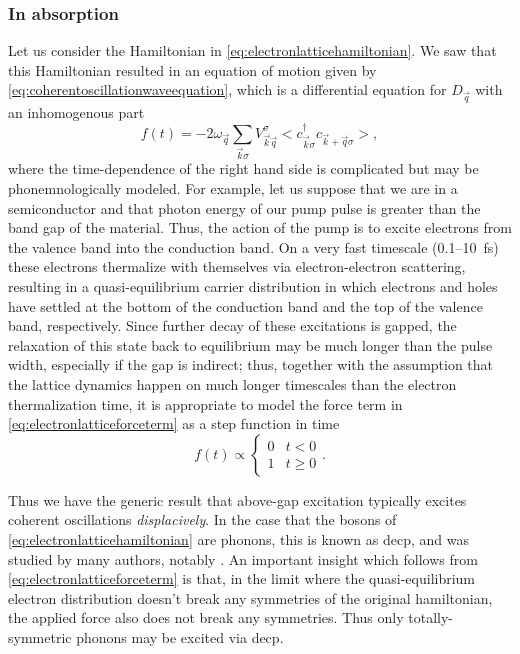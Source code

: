 \subsubsection{In absorption}

Let us consider the Hamiltonian in \cref{eq:electronlatticehamiltonian}.
We saw that this Hamiltonian resulted in an equation of motion given by \cref{eq:coherentoscillationwaveequation}, which is a differential equation for $D_{\vec{q}}$ with an inhomogenous part
\begin{equation}\label{eq:electronlatticeforceterm}
f(t) = -2\omega_{\vec{q}}\sum_{\vec{k}\sigma}V^\sigma_{\vec{k}\vec{q}}\big<c^\dagger_{\vec{k}\sigma} c_{\vec{k}+\vec{q}\sigma}\big>,
\end{equation}
where the time-dependence of the right hand side is complicated but may be phonemnologically modeled.
For example, let us suppose that we are in a semiconductor and that photon energy of our pump pulse is greater than the band gap of the material.
Thus, the action of the pump is to excite electrons from the valence band into the conduction band.
On a very fast timescale (\num{0.1}--\qty{10}{fs}) these electrons thermalize with themselves via electron-electron scattering, resulting in a quasi-equilibrium carrier distribution in which electrons and holes have settled at the bottom of the conduction band and the top of the valence band, respectively.
Since further decay of these excitations is gapped, the relaxation of this state back to equilibrium may be much longer than the pulse width, especially if the gap is indirect; thus, together with the assumption that the lattice dynamics happen on much longer timescales than the electron thermalization time, it is appropriate to model the force term in \cref{eq:electronlatticeforceterm} as a step function in time
\begin{equation}
f(t) \propto \begin{cases} 0 & t<0\\1 & t\ge 0 \end{cases}.
\end{equation}

Thus we have the generic result that above-gap excitation typically excites coherent oscillations \emph{displacively}.
In the case that the bosons of \cref{eq:electronlatticehamiltonian} are phonons, this is known as \gls{decp}, and was studied by many authors, notably \citet{zeiger_theory_1992}.
An important insight which follows from \cref{eq:electronlatticeforceterm} is that, in the limit where the quasi-equilibrium electron distribution doesn't break any symmetries of the original hamiltonian, the applied force also does not break any symmetries.
Thus only totally-symmetric phonons may be excited via \gls{decp}.

